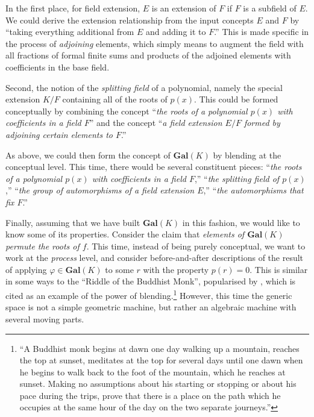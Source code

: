 In the first place, 
for field extension, $E$ is an extension of $F$ if $F$ is a subfield of $E$.
We could derive the extension relationship from the input concepts $E$
and $F$ by ``taking everything additional from $E$ and adding it to
$F$.''  This is made specific in the process of \emph{adjoining}
elements,
which simply means to augment 
the field 
with all
fractions of
formal finite sums and products of the adjoined elements with
coefficients in the base field.

Second, the notion of the \emph{splitting field} of a polynomial,
namely the special extension $K/F$ containing all of the roots of
$p(x)$.  This could be formed conceptually by combining the concept
``\emph{the roots of a polynomial $p(x)$ with coefficients in a field
  $F$}'' and the concept ``\emph{a field extension $E/F$ formed by
  adjoining certain elements to $F$}.'' 

As above, we could then form the concept of $\mathbf{Gal}(K)$ by blending
at the conceptual level.  This time, there would be several constituent pieces:
``\emph{the roots of a polynomial $p(x)$ with coefficients in a field $F$},''
``\emph{the splitting field of $p(x)$},''
``\emph{the group of automorphisms of a field extension $E$},''
``\emph{the automorphisms that fix $F$}.''

Finally, assuming that we have built $\mathbf{Gal}(K)$ in this
fashion, we would like to know some of its properties.  Consider the
claim that \emph{elements of $\mathbf{Gal}(K)$ permute the roots of
  $f$}.  This time, instead of being purely conceptual, we want to
work at the \emph{process} level, and consider before-and-after
descriptions of the result of applying $\varphi\in\mathbf{Gal}(K)$ to
some $r$ with the property $p(r)=0$.  This is similar in some ways to
the ``Riddle of the Buddhist Monk'', popularised by \textcite{Koestler64},
which is cited as
an example of the power of blending.\footnote{
  ``A Buddhist monk begins at dawn one day
  walking up a mountain, reaches the top at sunset, meditates at the
  top for several days until one dawn when he begins to walk back to
  the foot of the mountain, which he reaches at sunset.  Making no
  assumptions about his starting or stopping or about his pace during
  the trips, prove that there is a place on the path which he occupies
  at the same hour of the day on the two separate journeys.''}
However, this time the generic space is not a simple geometric machine,
but rather an algebraic machine with several moving parts.

